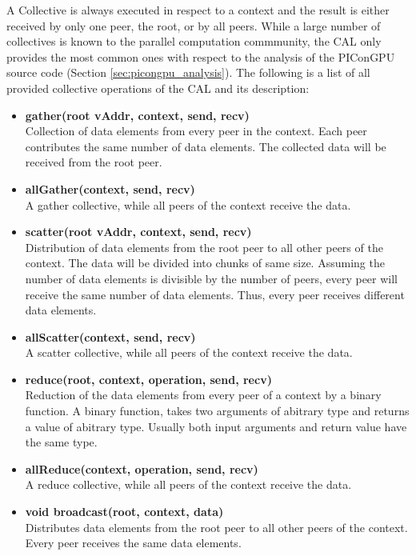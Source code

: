 A Collective is always executed in respect to a context and the result
is either received by only one peer, the root, or by all peers.  While
a large number of collectives is known to the parallel computation
commmunity, the CAL only provides the most common ones with respect to
the analysis of the PIConGPU source code (Section
\ref{sec:picongpu_analysis}).  The following is a list of all provided
collective operations of the CAL and its description:


\begin{itemize}
\item  \textbf{gather(root vAddr, context, send, recv)}\\
  Collection of data elements from every peer in the context. Each peer
  contributes the same number of data elements. The collected data will
  be received from the root peer.

\item \textbf{allGather(context, send, recv)}\\
  A gather collective, while all peers of the context receive the data.

\item  \textbf{scatter(root vAddr, context, send, recv)}\\
  Distribution of data elements from the root peer to all other peers of
  the context. The data will be divided into chunks of same
  size. Assuming the number of data elements is divisible by the number
  of peers, every peer will receive the same number of data
  elements. Thus, every peer receives different data elements.

\item  \textbf{allScatter(context, send, recv)}\\
  A scatter collective, while all peers of the context receive the data.

\item  \textbf{reduce(root, context, operation, send, recv)}\\
  Reduction of the data elements from every peer of a context by a
  binary function. A binary function, takes two arguments of abitrary
  type and returns a value of abitrary type. Usually both input
  arguments and return value have the same type.

\item  \textbf{allReduce(context, operation, send, recv)}\\
  A reduce collective, while all peers of the context receive the
  data.

\item  \textbf{void broadcast(root, context, data)}\\
  Distributes data elements from the root peer to all other peers of
  the context. Every peer receives the same data elements.


\end{itemize}
